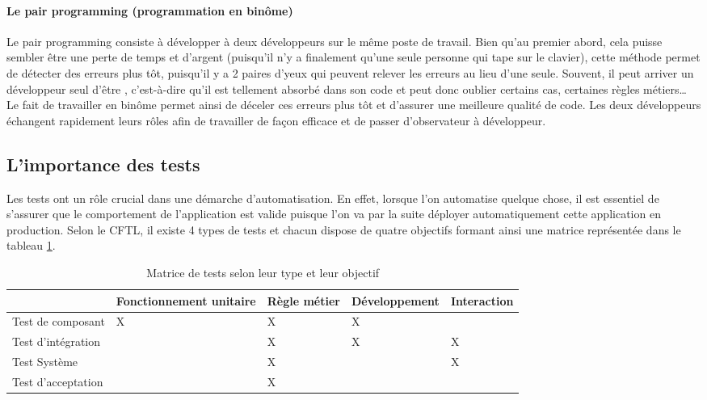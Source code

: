 \paragraph{Le pair programming (programmation en binôme)}

Le pair programming consiste à développer à deux développeurs sur le même poste de travail. Bien qu'au premier abord, cela puisse sembler être une perte de temps et d'argent (puisqu'il n'y a finalement qu'une seule personne qui tape sur le clavier), cette méthode permet de détecter des erreurs plus tôt, puisqu'il y a 2 paires d'yeux qui peuvent relever les erreurs au lieu d'une seule. Souvent, il peut arriver un développeur seul d'être , c'est-à-dire qu'il est tellement absorbé dans son code et peut donc oublier certains cas, certaines règles métiers\ldots{} Le fait de travailler en binôme permet ainsi de déceler ces erreurs plus tôt et d'assurer une meilleure qualité de code. Les deux développeurs échangent rapidement leurs rôles afin de travailler de façon efficace et de passer d'observateur à développeur. 

\subsection{L'importance des tests} \label{importance-test}

Les tests ont un rôle crucial dans une démarche d'automatisation. En effet, lorsque l'on automatise quelque chose, il est essentiel de s'assurer que le comportement de l'application est valide puisque l'on va par la suite déployer automatiquement cette application en production. Selon le \gls{CFTL}, il existe 4 types de tests et chacun dispose de quatre objectifs formant ainsi une matrice représentée dans le tableau \ref{tab:matrice-test}.

\begin{table}[H]
	\centering
	\begin{adjustbox}{width=0.95\textwidth,center=\textwidth} 
		\begin{tabular}{|l|l|l|l|l|}
			\hline
			\diagbox{type de test}{valide} & Fonctionnement unitaire & Règle métier & Développement & Interaction \\ \hline
			Test de composant     & X                       & X            & X              &             \\ \hline
			Test d'intégration    &                         & X            & X              & X           \\ \hline
			Test Système          &                         & X            &               & X           \\ \hline
			Test d'acceptation    &                         & X            &               &             \\ \hline
		\end{tabular}
	\end{adjustbox}
	\caption{Matrice de tests selon leur type et leur objectif}
	\label{tab:matrice-test}
\end{table}

